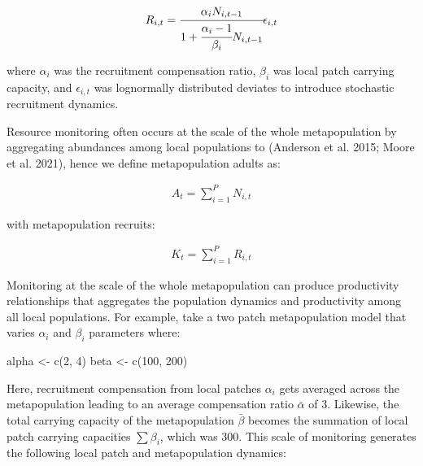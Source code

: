 \documentclass[
]{article}
\newenvironment{Shaded}{\begin{snugshade}}{\end{snugshade}}
\newcommand{\DecValTok}[1]{\textcolor[rgb]{0.00,0.00,0.81}{#1}}
\newcommand{\FunctionTok}[1]{\textcolor[rgb]{0.00,0.00,0.00}{#1}}
\newcommand{\NormalTok}[1]{#1}
\newcommand{\OtherTok}[1]{\textcolor[rgb]{0.56,0.35,0.01}{#1}}
\begin{document}
\begin{align}
R_{i,t}=\cfrac{\alpha_iN_{i,t-1}}{1+\cfrac{\alpha_i-1}{\beta_i}N_{i,t-1}}\epsilon_{i,t}
\end{align}

where \(\alpha_i\) was the recruitment compensation ratio, \(\beta_i\)
was local patch carrying capacity, and \(\epsilon_{i,t}\) was
lognormally distributed deviates to introduce stochastic recruitment
dynamics.

Resource monitoring often occurs at the scale of the whole
metapopulation by aggregating abundances among local populations to
(Anderson et al. 2015; Moore et al. 2021), hence we define
metapopulation adults as:

\begin{align}
{A}_t = \sum_{i=1}^{P} N_{i,t}
\end{align}

with metapopulation recruits:

\begin{align}
K_t = \sum_{i=1}^{P} R_{i,t}
\end{align}

Monitoring at the scale of the whole metapopulation can produce
productivity relationships that aggregates the population dynamics and
productivity among all local populations. For example, take a two patch
metapopulation model that varies \(\alpha_i\) and \(\beta_i\) parameters
where:

\begin{Shaded}
\begin{Highlighting}[]
\NormalTok{alpha }\OtherTok{\textless{}{-}} \FunctionTok{c}\NormalTok{(}\DecValTok{2}\NormalTok{, }\DecValTok{4}\NormalTok{)}
\NormalTok{beta }\OtherTok{\textless{}{-}} \FunctionTok{c}\NormalTok{(}\DecValTok{100}\NormalTok{, }\DecValTok{200}\NormalTok{)}
\end{Highlighting}
\end{Shaded}

Here, recruitment compensation from local patches \(\alpha_i\) gets
averaged across the metapopulation leading to an average compensation
ratio \(\bar{\alpha}\) of 3. Likewise, the total carrying capacity of
the metapopulation \(\bar{\beta}\) becomes the summation of local patch
carrying capacities \(\sum\beta_i\), which was 300. This scale of
monitoring generates the following local patch and metapopulation
dynamics:
\end{document}
